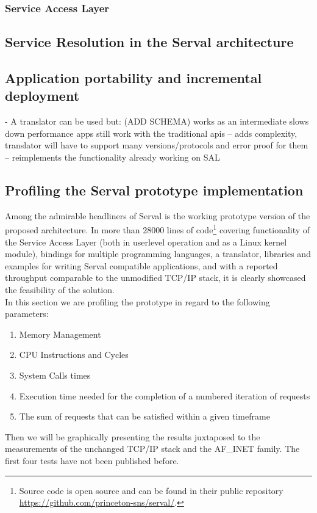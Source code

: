 \subsubsection{Service Access Layer}
\subsection{Service Resolution in the Serval architecture}

\subsection{Application portability and incremental deployment}
- A translator can be used but: (ADD SCHEMA)
works as an intermediate
slows down performance
apps still work with the traditional apis
 -- adds complexity, translator will have to support many versions/protocols and error proof for them
 -- reimplements the functionality already working on SAL




\subsection{Profiling the Serval prototype implementation}
Among the admirable headliners of Serval is the working prototype version of the proposed architecture.
In more than 28000 lines of code\footnote{Source code is open source and can be found in their public repository\\ \url{https://github.com/princeton-sns/serval/}.} covering functionality of the Service Access Layer (both in userlevel operation and as a Linux kernel module), bindings for multiple programming languages, a translator, libraries and examples for writing Serval compatible applications, and with a reported throughput comparable to the unmodified TCP/IP stack, it is clearly showcased the feasibility of the solution.\\
\indent In this section we are profiling the prototype in regard to the following parameters:
\begin{enumerate}
  \item Memory Management
  \item CPU Instructions and Cycles
  \item System Calls times
  \item Execution time needed for the completion of a numbered iteration of requests
  \item The sum of requests that can be satisfied within a given timeframe
\end{enumerate}
Then we will be graphically presenting the results juxtaposed to the measurements of the unchanged TCP/IP stack and the AF\_INET family. The first four tests have not been published before.
